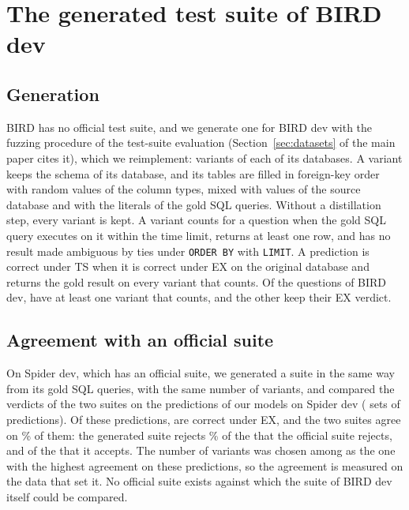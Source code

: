 \section{The generated test suite of BIRD dev}\label{sup:suite}

\subsection{Generation}

BIRD has no official
test suite, and we generate one for BIRD dev with the fuzzing procedure
of the test-suite evaluation (Section~\ref{sec:datasets} of the main
paper cites it), which we reimplement:  variants of
each of its  databases. A variant keeps the
schema of its database, and its tables are filled in foreign-key order
with random values of the column types, mixed with values of the source
database and with the literals of the gold SQL queries. Without a
distillation step, every variant is kept. A variant counts for a
question when the gold SQL query executes on it within the time limit,
returns at least one row, and has no result made ambiguous by ties under
\texttt{ORDER BY} with \texttt{LIMIT}. A prediction is correct under TS
when it is correct under EX on the original database and returns the
gold result on every variant that counts. Of the 
questions of BIRD dev,  have at least one
variant that counts, and the other  keep their EX
verdict.

\subsection{Agreement with an official suite}

On Spider dev, which has an
official suite, we generated a suite in the same way from its gold SQL
queries, with the same number of variants, and compared the verdicts of
the two suites on the predictions of our models on Spider dev
( sets of predictions). Of these predictions,
 are correct under EX, and the two suites
agree on \% of them: the generated
suite rejects \% of the
 that the official suite rejects,
and  of the
 that it accepts. The number of
variants was chosen among  as the one with
the highest agreement on these predictions, so the agreement is measured
on the data that set it. No official suite exists against which the
suite of BIRD dev itself could be compared.

